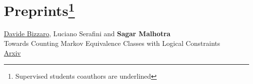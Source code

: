 \documentclass[10pt, a4paper]{article}
\newcommand{\years}[1]{\marginnote{\scriptsize #1}}
\begin{document}
\section*{Preprints\footnote[1]{Supervised students coauthors are underlined}}
\years{2024} \underline{Davide Bizzaro}, Luciano Serafini and \textbf{Sagar Malhotra}\\
Towards Counting Markov Equivalence Classes with Logical Constraints\\
\href{https://arxiv.org/abs/2405.13736}{Arxiv} 





\end{document}

